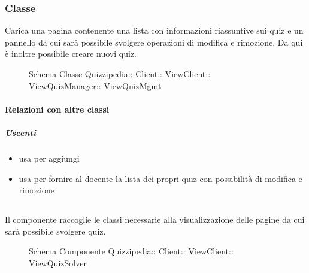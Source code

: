 \subsubsection{Classe }
Carica una pagina contenente una lista con informazioni riassuntive sui quiz e un pannello da cui sarà possibile svolgere operazioni di modifica e rimozione. Da qui è inoltre possibile creare nuovi quiz.
\begin{figure}[H]
\centering
\noindent{}
\caption[Schema Classe ViewQuizMgmt]{Schema Classe Quizzipedia:: Client:: ViewClient:: ViewQuizManager:: ViewQuizMgmt}
\end{figure}
\paragraph{Relazioni con altre classi}
\subparagraph{Uscenti}
\begin{itemize}
\item usa  per aggiungi
\item usa  per fornire al docente la lista dei propri quiz con possibilità di modifica e rimozione
\end{itemize}
\subsection{}
Il componente raccoglie le classi necessarie alla visualizzazione delle pagine da cui sarà possibile svolgere quiz.
\begin{figure}[H]
\centering
\noindent{}
\caption[Schema Componente ViewQuizSolver]{Schema Componente Quizzipedia:: Client:: ViewClient:: ViewQuizSolver}
\end{figure}
